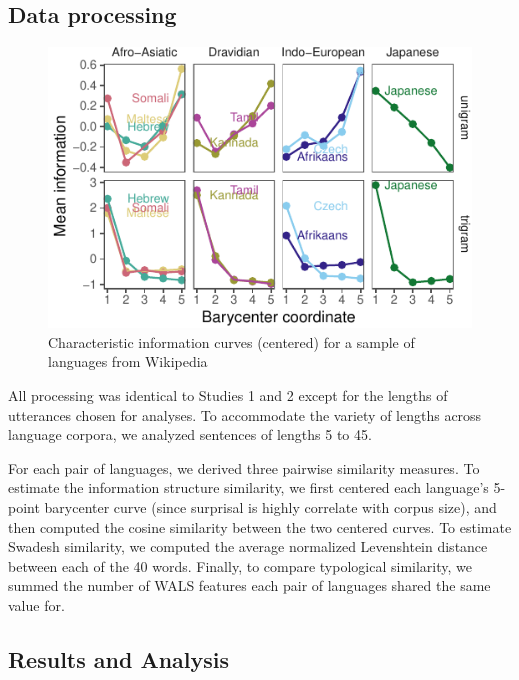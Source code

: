 \documentclass[
  english,
  man,floatsintext]{apa6}
\begin{document}
\hypertarget{data-processing-1}{%
\subsection{Data processing}\label{data-processing-1}}

\begin{figure}
\centering
\includegraphics{figs/diff-languages-1.pdf}
\caption{\label{fig:diff-languages}Characteristic information curves (centered) for a sample of languages from Wikipedia}
\end{figure}

All processing was identical to Studies 1 and 2 except for the lengths of utterances chosen for analyses. To accommodate the variety of lengths across language corpora, we analyzed sentences of lengths 5 to 45.

For each pair of languages, we derived three pairwise similarity measures. To estimate the information structure similarity, we first centered each language's 5-point barycenter curve (since surprisal is highly correlate with corpus size), and then computed the cosine similarity between the two centered curves. To estimate Swadesh similarity, we computed the average normalized Levenshtein distance between each of the 40 words. Finally, to compare typological similarity, we summed the number of WALS features each pair of languages shared the same value for.

\hypertarget{results-and-analysis}{%
\subsection{Results and Analysis}\label{results-and-analysis}}
\end{document}
